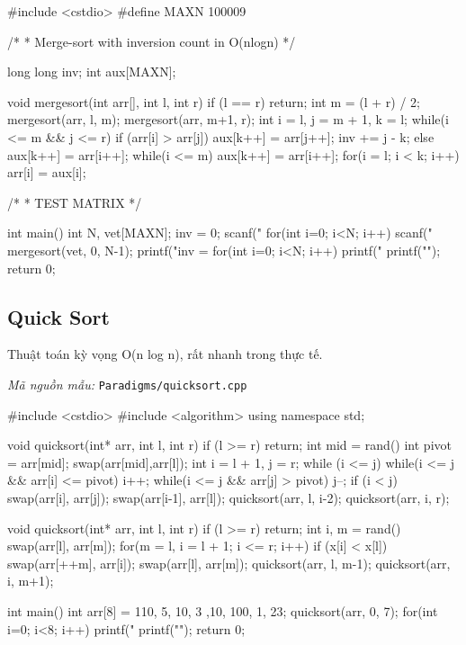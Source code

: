 \documentclass[11pt]{article}
\newcommand{\codepath}[1]{\par\noindent\textit{Mã nguồn mẫu:} \texttt{#1}\par}
\begin{document}
\begingroup\scriptsize
\begin{vncode}
#include <cstdio>
#define MAXN 100009

/*
 * Merge-sort with inversion count in O(nlogn)
 */

long long inv;
int aux[MAXN];

void mergesort(int arr[], int l, int r) {
	if (l == r) return;
	int m = (l + r) / 2;
	mergesort(arr, l, m);
	mergesort(arr, m+1, r);
	int i = l, j = m + 1, k = l;
	while(i <= m && j <= r) {
		if (arr[i] > arr[j]) {
			aux[k++] = arr[j++];
			inv += j - k;
		}
		else aux[k++] = arr[i++];
	}
	while(i <= m) aux[k++] = arr[i++];
	for(i = l; i < k; i++) arr[i] = aux[i];
}

/*
 * TEST MATRIX
 */

int main() {
	int N, vet[MAXN];
	inv = 0;
	scanf("%
	for(int i=0; i<N; i++) {
		scanf("%
	}
	mergesort(vet, 0, N-1);
	printf("inv = %
	for(int i=0; i<N; i++) {
		printf(" %
	}
	printf("\n");
	return 0;
}
\end{vncode}
\endgroup


\subsection{Quick Sort}

Thuật toán kỳ vọng O(n log n), rất nhanh trong thực tế.

\codepath{Paradigms/quicksort.cpp}

\begingroup\scriptsize
\begin{vncode}
#include <cstdio>
#include <algorithm>
using namespace std;

void quicksort(int* arr, int l, int r) {
    if (l >= r) return;
    int mid = rand()%
    int pivot = arr[mid];
    swap(arr[mid],arr[l]);
    int i = l + 1, j = r;
    while (i <= j) {
        while(i <= j && arr[i] <= pivot) i++;
        while(i <= j && arr[j] > pivot) j--;
        if (i < j) swap(arr[i], arr[j]);
    }
    swap(arr[i-1], arr[l]);
    quicksort(arr, l, i-2);
    quicksort(arr, i, r);
}

void quicksort(int* arr, int l, int r) {
    if (l >= r) return;
    int i, m = rand()%
	swap(arr[l], arr[m]);
	for(m = l, i = l + 1; i <= r; i++) {
		if (x[i] < x[l]) swap(arr[++m], arr[i]);
	}
    swap(arr[l], arr[m]);
    quicksort(arr, l, m-1);
    quicksort(arr, i, m+1);
}

int main() {
    int arr[8] = {110, 5, 10, 3 ,10, 100, 1, 23};
    quicksort(arr, 0, 7);
    for(int i=0; i<8; i++) {
        printf("%
    }
    printf("\n");
    return 0;
}
\end{vncode}
\endgroup
\end{document}
